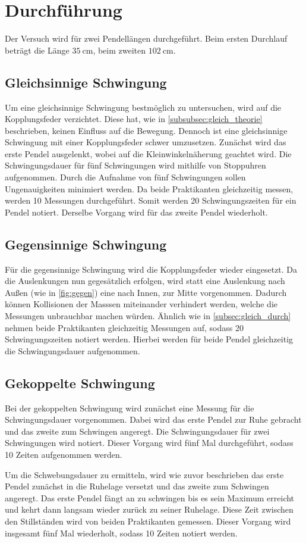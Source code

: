 \section{Durchführung}
\label{sec:Durchführung}
Der Versuch wird für zwei Pendellängen durchgeführt.
Beim ersten Durchlauf beträgt die Länge $\SI{35}{\centi\metre}$, beim zweiten $\SI{102}{\centi\metre}$.

\subsection{Gleichsinnige Schwingung}
\label{subsec:gleich_durch}
Um eine gleichsinnige Schwingung bestmöglich zu untersuchen, wird auf die Kopplungsfeder verzichtet.
Diese hat, wie in \autoref{subsubsec:gleich_theorie} beschrieben, keinen Einfluss auf die Bewegung.
Dennoch ist eine gleichsinnige Schwingung mit einer Kopplungsfeder schwer umzusetzen.
\noindent
Zunächst wird das erste Pendel ausgelenkt, wobei auf die Kleinwinkelnäherung geachtet wird.
Die Schwingungsdauer für fünf Schwingungen wird mithilfe von Stoppuhren aufgenommen.
Durch die Aufnahme von fünf Schwingungen sollen Ungenauigkeiten minimiert werden.
Da beide Praktikanten gleichzeitig messen, werden 10 Messungen durchgeführt.
Somit werden 20 Schwingungszeiten für ein Pendel notiert.
Derselbe Vorgang wird für das zweite Pendel wiederholt.

\subsection{Gegensinnige Schwingung}
Für die gegensinnige Schwingung wird die Kopplungsfeder wieder eingesetzt.
Da die Auslenkungen nun gegesätzlich erfolgen, wird statt eine Auslenkung nach Außen (wie in \autoref{fig:gegen})
eine nach Innen, zur Mitte vorgenommen. Dadurch können Kollisionen der Masssen miteinander verhindert werden,
welche die Messungen unbrauchbar machen würden.
Ähnlich wie in \autoref{subsec:gleich_durch} nehmen beide Praktikanten gleichzeitig Messungen auf, sodass 20 Schwingungszeiten notiert werden.
Hierbei werden für beide Pendel gleichzeitig die Schwingungsdauer aufgenommen.

\subsection{Gekoppelte Schwingung}
Bei der gekoppelten Schwingung wird zunächst eine Messung für die Schwingungsdauer vorgenommen.
Dabei wird das erste Pendel zur Ruhe gebracht und das zweite zum Schwingen angeregt.
Die Schwingungsdauer für zwei Schwingungen wird notiert.
Dieser Vorgang wird fünf Mal durchgeführt, sodass 10 Zeiten aufgenommen werden.

\noindent
Um die Schwebungsdauer zu ermitteln, wird wie zuvor beschrieben das erste Pendel zunächst in die Ruhelage versetzt und das zweite zum Schwingen
angeregt.
Das erste Pendel fängt an zu schwingen bis es sein Maximum erreicht und kehrt dann langsam wieder zurück zu seiner Ruhelage.
Diese Zeit zwischen den Stillständen wird von beiden Praktikanten gemessen.
Dieser Vorgang wird insgesamt fünf Mal wiederholt, sodass 10 Zeiten notiert werden.